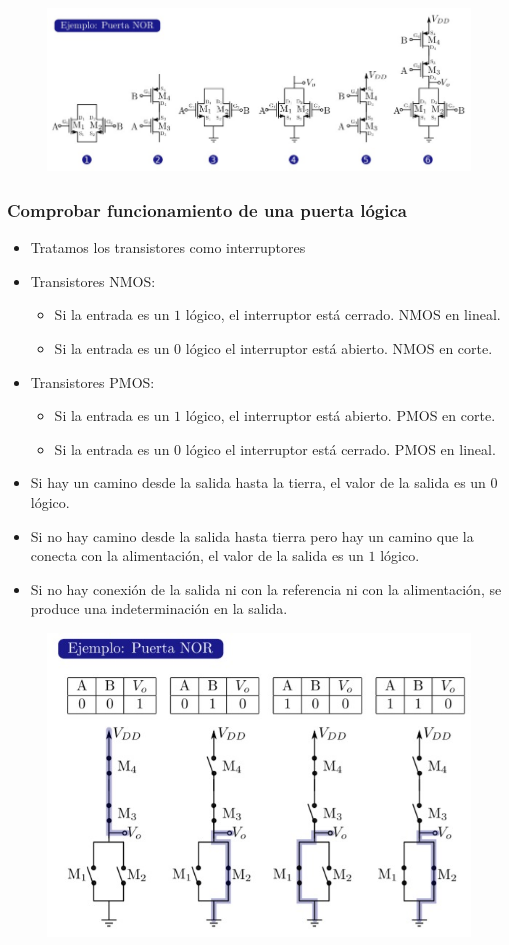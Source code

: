 \documentclass[10pt,a4paper]{article}
\begin{document}
	\begin{figure}[h]
		\centering
		\includegraphics[scale = 0.5]{CMOS_NOR}
	\end{figure}
	
	\subsubsection{Comprobar funcionamiento de una puerta lógica}
	
	\begin{itemize}
		\item Tratamos los transistores como interruptores
		\item Transistores NMOS:
		\begin{itemize}
			\item Si la entrada es un $1$ lógico, el interruptor está cerrado. NMOS en lineal.
			\item Si la entrada es un $0$ lógico el interruptor está abierto. NMOS en corte.
		\end{itemize}
		\item Transistores PMOS:
		\begin{itemize}
			\item Si la entrada es un $1$ lógico, el interruptor está abierto. PMOS en corte.
			\item Si la entrada es un $0$ lógico el interruptor está cerrado. PMOS en lineal.
		\end{itemize}
		\item Si hay un camino desde la salida hasta la tierra, el valor de la salida es un $0$ lógico.
		\item Si no hay camino desde la salida hasta tierra pero hay un camino que la conecta con la alimentación, el valor de la salida es un $1$ lógico.
		\item Si no hay conexión de la salida ni con la referencia ni con la alimentación, se produce una indeterminación en la salida.
	\end{itemize}
	
	\begin{figure}[h]
		\centering
		\includegraphics[scale = 0.5]{CMOS_NOR_func}
	\end{figure}
\end{document}
